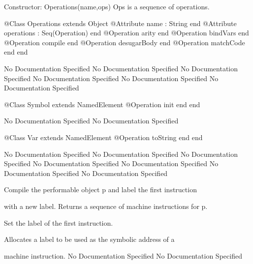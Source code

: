       Constructor: Operations(name,ops)
        Ops is a sequence of operations.
\begin{Interface}
@Class Operations extends Object
  @Attribute name : String end
  @Attribute operations : Seq(Operation) end
  @Operation arity end
  @Operation bindVars end
  @Operation compile end
  @Operation desugarBody end
  @Operation matchCode end
end
\end{Interface}
No Documentation Specified
No Documentation Specified
No Documentation Specified
No Documentation Specified
No Documentation Specified
No Documentation Specified
\begin{Interface}
@Class Symbol extends NamedElement
  @Operation init end
end
\end{Interface}
No Documentation Specified
No Documentation Specified
\begin{Interface}
@Class Var extends NamedElement
  @Operation toString end
end
\end{Interface}
No Documentation Specified
No Documentation Specified
No Documentation Specified
No Documentation Specified
No Documentation Specified
No Documentation Specified
No Documentation Specified

        Compile the performable object p and label the first instruction

        with a new label. Returns a sequence of machine instructions for p.

        Set the label of the first instruction.

        Allocates a label to be used as the symbolic address of a

        machine instruction.
No Documentation Specified
No Documentation Specified

